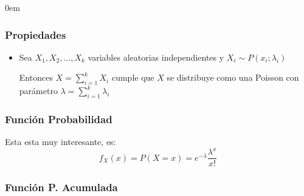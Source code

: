 \documentclass[12pt, fleqn]{report}                             %
\newenvironment{SmallIndentation}[1][0.75em]                    %
        {\begin{adjustwidth}{#1}{}\begin{footnotesize}}             %
        {\end{footnotesize}\end{adjustwidth}}                       %
\newcommand \ForceColumnBreak {\vfill\null\columnbreak}         %
\theoremstyle{break}                                            %
\begin{document}
\begin{multicols}{2}
\begin{SmallIndentation}[0em]
                    \subsubsection{Propiedades}

                        \begin{itemize}
                            
                            \item 
                                Sea $X_1, X_2, \dots, X_k$ variables aleatorias independientes
                                y $X_i \sim P(x_i; \lambda_i)$ 

                                Entonces $X = \sum_{i = 1}^k X_i$ cumple que $X$ se distribuye como
                                una Poisson con parámetro $\lambda = \sum_{i=1}^k \lambda_i$

                        \end{itemize}


                    \ForceColumnBreak


                    \subsubsection{Función Probabilidad}

                        Esta esta muy interesante, es:
                        \begin{equation*}
                            f_X(x) = P(X = x) = e^{- \lambda} \dfrac{\lambda^x}{x!}
                        \end{equation*}


                    \subsubsection{Función P. Acumulada}


\end{SmallIndentation}
\end{multicols}
\end{document}
